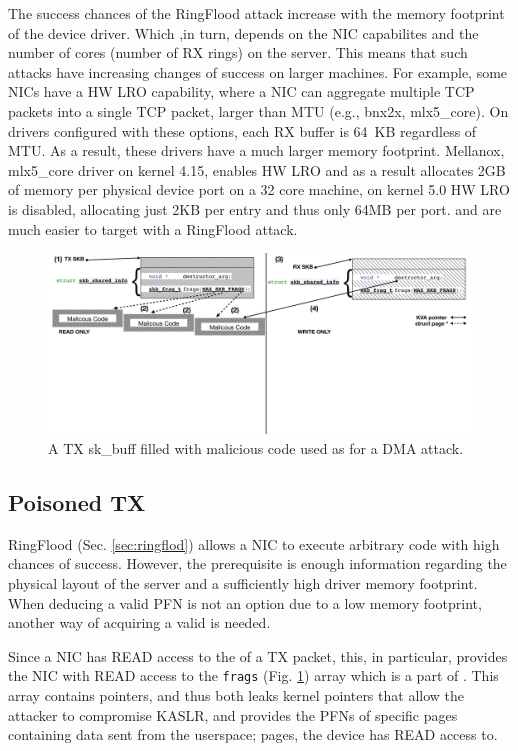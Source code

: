 The success chances of the RingFlood attack increase with the memory footprint of the device driver. Which ,in turn, depends on the NIC capabilites and the number of cores (number of RX rings) on the server. This means that such attacks have increasing changes of success on larger machines. 
For example, some NICs have a HW LRO capability\cite{mlx5_lro}, where a NIC can aggregate multiple TCP packets into a single TCP packet, larger than MTU (e.g., bnx2x, mlx5\_core). On drivers configured with these options, each RX buffer is 64~KB regardless of MTU. As a result, these drivers have a much larger memory footprint. Mellanox, mlx5\_core driver on kernel 4.15, enables HW LRO and as a result allocates 2GB of memory per physical device port on a 32 core machine, on kernel 5.0 HW LRO is disabled, allocating just 2KB per entry and thus only 64MB per port. and are much easier to target with a RingFlood attack.

\begin{figure}[t]
    \centering
    \includegraphics[width=\linewidth]{figs/accomplice.pdf}
    \caption{A TX sk\_buff filled with malicious code used as \means{} for a DMA attack.}
    \label{fig:payload}
\end{figure}
\subsection{Poisoned TX}\label{sec:posion}

RingFlood (Sec. \ref{sec:ringflod}) allows a NIC to execute arbitrary code with high chances of success. However, the prerequisite is enough information regarding the physical layout of the server and a sufficiently high driver memory footprint. When deducing a valid PFN is not an option due to a low memory footprint, another way of acquiring a valid \kva{} is needed.

Since a NIC has READ access to the \shinfo{} of a TX packet, this, in particular, provides the NIC with READ access to the \texttt{frags} (Fig. \ref{fig:payload}) array which is a part of \shinfo{}. This array contains \page{} pointers, and thus both leaks kernel pointers that allow the attacker to compromise KASLR, and provides the PFNs of specific pages containing data sent from the userspace; pages, the device has READ access to.

